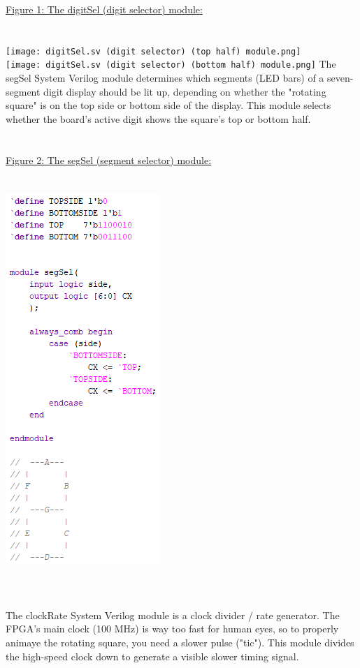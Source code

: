 \documentclass[12pt, letterpaper]{article}
\begin{document}
\underline{Figure 1: The digitSel (digit selector) module:}\\\\\\
\texttt{[image: digitSel.sv (digit selector) (top half) module.png]}\\
\texttt{[image: digitSel.sv (digit selector) (bottom half) module.png]}\newpage
\noindent The segSel System Verilog module determines which segments (LED bars) of a seven-segment digit display should be lit up, depending on whether the "rotating square" is on the top side or bottom side of the display. This module selects whether the board's active digit shows the square's top or bottom half.\\\\\\
\underline{Figure 2: The segSel (segment selector) module:}\\\\\\
\includegraphics{segSel.sv (segment selector) module.png}
\\\\\\\\The clockRate System Verilog module is a clock divider / rate generator. The FPGA's main clock (100 MHz) is way too fast for human eyes, so to properly animaye the rotating square, you need a slower pulse ("tic"). This module divides the high-speed clock down to generate a visible slower timing signal.\\\\\\
\end{document}
